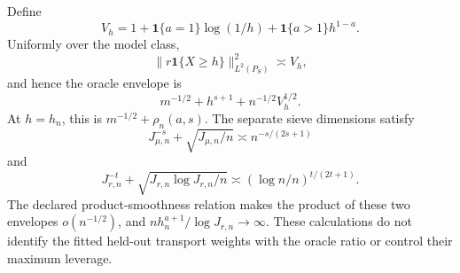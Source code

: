 Define
\[
V_h=1+\mathbf 1\{a=1\}\log(1/h)+\mathbf 1\{a>1\}h^{1-a}.
\]
Uniformly over the model class,
\[
\|r\mathbf 1\{X\ge h\}\|_{L^2(P_S)}^2\asymp V_h,
\]
and hence the oracle envelope is
\[
m^{-1/2}+h^{s+1}+n^{-1/2}V_h^{1/2}.
\]
At \(h=h_n\), this is \(m^{-1/2}+\rho_n(a,s)\). The separate sieve dimensions satisfy
\[
J_{\mu,n}^{-s}+\sqrt{J_{\mu,n}/n}\asymp n^{-s/(2s+1)}
\]
and
\[
J_{r,n}^{-t}+\sqrt{J_{r,n}\log J_{r,n}/n}
\asymp(\log n/n)^{t/(2t+1)}.
\]
The declared product-smoothness relation makes the product of these two envelopes \(o(n^{-1/2})\), and \(nh_n^{a+1}/\log J_{r,n}\to\infty\). These calculations do not identify the fitted held-out transport weights with the oracle ratio or control their maximum leverage.